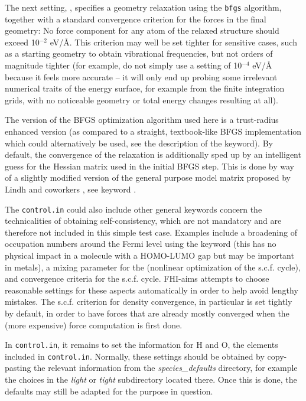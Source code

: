 The next setting, , specifies a
geometry relaxation using the \texttt{bfgs} algorithm, together with a
standard convergence criterion for the forces in the final geometry:
No force component for any atom of the relaxed structure should exceed
10$^{-2}$ eV/{\AA}. This criterion may well be set tighter
for sensitive cases, such as a starting geometry to obtain
vibrational frequencies, but not orders of magnitude tighter (for example,
do not simply use a setting of 10$^{-4}$ eV/{\AA} because it feels more
accurate -- it will only end up probing some irrelevant
numerical traits of the energy surface, for example from the finite
integration grids, with no noticeable geometry or total energy changes
resulting at all). 

The version of the BFGS optimization algorithm used here is a trust-radius
enhanced version (as compared to a straight, textbook-like BFGS implementation
which could alternatively be used, see the description of the
 keyword). By default, the convergence of the
relaxation is additionally sped up by an intelligent guess for the Hessian
matrix used in the initial BFGS step. This is done by way of a slightly
modified version of the general purpose model matrix proposed by Lindh and
coworkers \cite{Lin95}, see keyword .

The \texttt{control.in} could also include other general keywords
concern the technicalities of obtaining self-consistency, which are
not mandatory and are therefore not included in this simple test case.
Examples include a broadening of occupation numbers around
the Fermi level using the  
 keyword (this has no physical impact in a
molecule with a HOMO-LUMO gap but may be important in metals), a
mixing parameter  for the 
(nonlinear optimization of the s.c.f. cycle), and convergence criteria for 
the s.c.f. cycle. FHI-aims attempts to choose reasonable settings for
these aspects automatically in order to help avoid lengthy
mistakes. The s.c.f. criterion for density convergence,
 in particular is set tightly by default,
in order to have forces that are already mostly converged when the
(more expensive) force computation is first done.  

In \texttt{control.in}, it remains to set the 
information for H and O, the elements included in
\texttt{control.in}. Normally, these settings should be obtained by
copy-pasting the relevant information from the
\emph{species\_defaults} directory, for example the 
choices in the \emph{light} or \emph{tight} subdirectory located there. Once 
this is done, the  defaults may still be adapted
for the purpose in question. 

